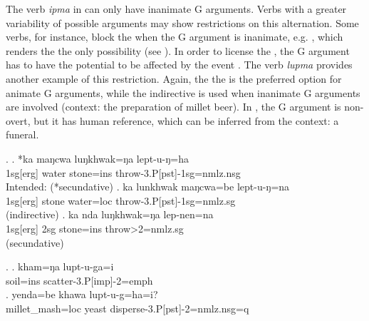 The verb \emph{ipma}  in \Last can only have inanimate G arguments. Verbs with a greater variability of possible arguments may show restrictions on this alternation. Some verbs, for instance, block the  when the G argument is inanimate, e.g.  \Next[a], which renders the  the only possibility (see \Next[b]). In order to license the , the G argument has to have the potential to be affected by the event \Next[c].  
The verb \emph{lupma}  provides another example of this restriction. Again, the the  is the preferred option for animate G arguments, while the indirective is used when inanimate G arguments are involved \NNext[b] (context: the preparation of millet beer). In \NNext[a], the G argument is non-overt, but it has human reference, which can be inferred from the context: a funeral. 

\ex.	\ag.  *ka maŋcwa luŋkhwak=ŋa lept-u-ŋ=ha \\
	{\sc 1sg[erg]} water stone{\sc =ins}	throw{\sc -3.P[pst]-1sg=nmlz.nsg}	\\
	Intended:    (*secundative)
	\bg.  ka lunkhwak maŋcwa=be  lept-u-ŋ=na \\
	{\sc 1sg[erg]} stone  water{\sc =loc}  	throw{\sc -3.P[pst]-1sg=nmlz.sg}	\\
   (indirective)  
 \bg. ka nda luŋkhwak=ŋa lep-nen=na\\
 {\sc 1sg[erg]} {\sc 2sg} stone{\sc =ins}	throw{>2=nmlz.sg}	\\
  (secundative)

\ex. \ag. kham=ŋa lupt-u-ga=i\\ 
	soil{\sc =ins} scatter{\sc -3.P[imp]-2=emph} \\
	\bg. yenda=be khawa lupt-u-g=ha=i?\\
	millet\_mash{\sc =loc} yeast disperse{\sc -3.P[pst]-2=nmlz.nsg=q}   \\
	 
 
